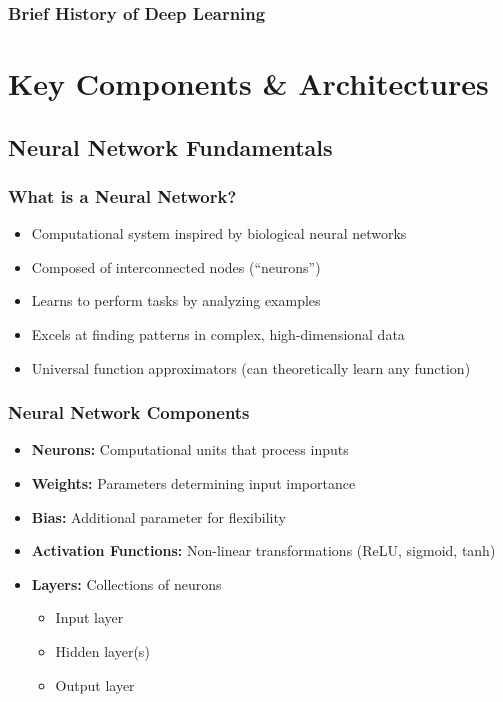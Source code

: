 \documentclass[5pt,aspectratio=169]{beamer}
\begin{document}
\begin{frame}
\frametitle{Brief History of Deep Learning}
\end{frame}


\section{Key Components \& Architectures}
\subsection{Neural Network Fundamentals}
\begin{frame}
\frametitle{What is a Neural Network?}
\begin{itemize}
    \item Computational system inspired by biological neural networks
    \item Composed of interconnected nodes (``neurons'')
    \item Learns to perform tasks by analyzing examples
    \item Excels at finding patterns in complex, high-dimensional data
    \item Universal function approximators (can theoretically learn any function)
\end{itemize}
\end{frame}

\begin{frame}
\frametitle{Neural Network Components}
\begin{itemize}
    \item \textbf{Neurons:} Computational units that process inputs
    \item \textbf{Weights:} Parameters determining input importance
    \item \textbf{Bias:} Additional parameter for flexibility
    \item \textbf{Activation Functions:} Non-linear transformations (ReLU, sigmoid, tanh)
    \item \textbf{Layers:} Collections of neurons
    \begin{itemize}
        \item Input layer
        \item Hidden layer(s)
        \item Output layer
    \end{itemize}
\end{itemize}
\end{frame}
\end{document}
